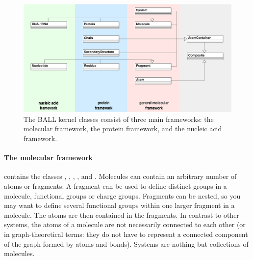 \begin{figure}[tb]
  \centering\includegraphics[width=\textwidth]{kernel-data-structures.eps}
  \caption{The BALL kernel classes consist of three main frameworks: the
           molecular framework, the protein framework, and the nucleic acid
           framework.}
  \label{figure:kernel-frameworks}
\end{figure}

\paragraph{The molecular framework}contains the classes ,
, , , and . 
Molecules can contain an arbitrary number of atoms or fragments. A fragment
can be used to define distinct groups in a molecule, \eg functional groups or
charge groups. Fragments can be nested, so you may want to define several
functional groups within one larger fragment in a molecule. The atoms are then
contained in the fragments. In contrast to other systems, the atoms of a
molecule are not necessarily connected to each other (or in graph-theoretical
terms: they do not have to represent a connected component of the graph
formed by atoms and bonds). Systems are nothing but collections of molecules.

